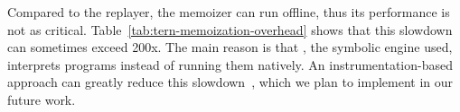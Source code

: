 

Compared to the replayer, the memoizer can run offline, thus its
performance is not as critical.  Table~\ref{tab:tern-memoization-overhead}
shows that this slowdown can sometimes exceed 200x.  The main reason
is that \klee, the symbolic engine used, interprets programs instead of
running them natively.  An instrumentation-based approach can greatly
reduce this slowdown~\cite{cadar:exe:ccs06}, which we plan to implement in
our future work.  


